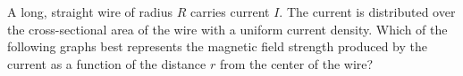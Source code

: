 
\begin{questions}
\setcounter{question}{23}

\question
A long, straight wire of radius $R$ carries current $I$. The current is distributed over the cross-sectional area of the wire with a uniform current density. Which of the following graphs best represents the magnetic field strength produced by the current as a function of the distance $r$ from the center of the wire?

\begin{oneparchoices}
    \choice {}
    \choice {}

\end{oneparchoices}
\end{questions}
